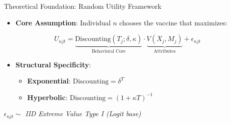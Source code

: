 \documentclass[10pt]{beamer}
\begin{document}
\begin{frame}{Theoretical Foundation: Random Utility Framework}
    \begin{itemize}
        \item \textbf{Core Assumption}: Individual $n$ chooses the vaccine that maximizes:
    \end{itemize}
    
    \begin{equation}
        U_{njt} = \underbrace{\text{Discounting}(T_j; \delta, \kappa)}_{\text{Behavioral Core}} \cdot \underbrace{V(X_j, M_j)}_{\text{Attributes}} + \epsilon_{njt}
    \end{equation}
    
    \vspace{0.4cm}
    \begin{itemize}
        \item \textbf{Structural Specificity}:
        \begin{itemize}
            \item \textbf{Exponential}: $\text{Discounting} = \delta^T$
            \item \textbf{Hyperbolic}: $\text{Discounting} = (1 + \kappa T)^{-1}$
        \end{itemize}
    \end{itemize}
    \vfill
    \centering \textit{$\epsilon_{njt} \sim$ IID Extreme Value Type I (Logit base)}
\end{frame}
\end{document}
